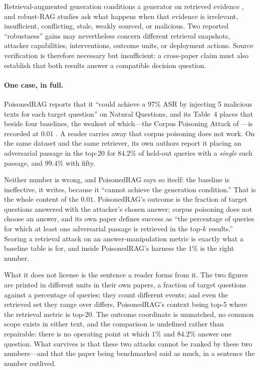 \documentclass[11pt]{article}
\begin{document}
Retrieval-augmented generation conditions a generator on retrieved evidence
\citep{lewis2020rag,dpr2020,realm2020}, and robust-RAG studies ask what happens
when that evidence is irrelevant, insufficient, conflicting, stale, weakly
sourced, or malicious. Two reported ``robustness'' gains may nevertheless
concern different retrieval snapshots, attacker capabilities, interventions,
outcome units, or deployment actions. Source verification is therefore
necessary but insufficient: a cross-paper claim must also establish that both
results answer a compatible decision question.

\paragraph{One case, in full.}
PoisonedRAG reports that it ``could achieve a 97\% ASR by injecting 5 malicious
texts for each target question'' on Natural Questions, and its Table~4 places
that beside four baselines, the weakest of which---the Corpus Poisoning Attack
of \citet{poisoningRetrievalCorpora2023}---is recorded at $0.01$
\citep{poisonedRAG2024}. A reader carries away that corpus poisoning does not
work. On the same dataset and the same retriever, its own authors report it
placing an adversarial passage in the top-20 for $84.2\%$ of held-out queries
with a \emph{single} such passage, and $99.4\%$ with fifty.

Neither number is wrong, and PoisonedRAG says so itself: the baseline is
ineffective, it writes, because it ``cannot achieve the generation condition.''
That is the whole content of the $0.01$. PoisonedRAG's outcome is the fraction
of target questions answered with the attacker's chosen answer; corpus
poisoning does not choose an answer, and its own paper defines success as ``the
percentage of queries for which at least one adversarial passage is retrieved in
the top-$k$ results.'' Scoring a retrieval attack on an answer-manipulation
metric is exactly what a baseline table is for, and inside PoisonedRAG's harness
the $1\%$ is the right number.

What it does not license is the sentence a reader forms from it. The two figures
are printed in different units in their own papers, a fraction of target
questions against a percentage of queries; they count different events; and even
the retrieved set they range over differs, PoisonedRAG's context being top-5
where the retrieval metric is top-20. The outcome coordinate is unmatched, no
common scope exists in either text, and the comparison is undefined rather than
repairable: there is no operating point at which $1\%$ and $84.2\%$ answer one
question. What survives is that these two attacks cannot be ranked by these two
numbers---and that the paper being benchmarked said as much, in a sentence the
number outlived.
\end{document}
